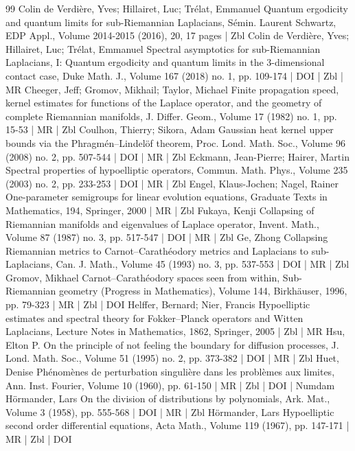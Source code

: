 \begin{thebibliography}{99}
Colin de Verdière, Yves; Hillairet, Luc; Trélat, Emmanuel Quantum ergodicity and quantum limits for sub-Riemannian Laplacians, Sémin. Laurent Schwartz, EDP Appl., Volume 2014-2015 (2016), 20, 17 pages | Zbl
Colin de Verdière, Yves; Hillairet, Luc; Trélat, Emmanuel Spectral asymptotics for sub-Riemannian Laplacians, I: Quantum ergodicity and quantum limits in the 3-dimensional contact case, Duke Math. J., Volume 167 (2018) no. 1, pp. 109-174 | DOI | Zbl | MR
Cheeger, Jeff; Gromov, Mikhail; Taylor, Michael Finite propagation speed, kernel estimates for functions of the Laplace operator, and the geometry of complete Riemannian manifolds, J. Differ. Geom., Volume 17 (1982) no. 1, pp. 15-53 | MR | Zbl
Coulhon, Thierry; Sikora, Adam Gaussian heat kernel upper bounds via the Phragmén–Lindelöf theorem, Proc. Lond. Math. Soc., Volume 96 (2008) no. 2, pp. 507-544 | DOI | MR | Zbl
Eckmann, Jean-Pierre; Hairer, Martin Spectral properties of hypoelliptic operators, Commun. Math. Phys., Volume 235 (2003) no. 2, pp. 233-253 | DOI | MR | Zbl
Engel, Klaus-Jochen; Nagel, Rainer One-parameter semigroups for linear evolution equations, Graduate Texts in Mathematics, 194, Springer, 2000 | MR | Zbl
Fukaya, Kenji Collapsing of Riemannian manifolds and eigenvalues of Laplace operator, Invent. Math., Volume 87 (1987) no. 3, pp. 517-547 | DOI | MR | Zbl
Ge, Zhong Collapsing Riemannian metrics to Carnot–Carathéodory metrics and Laplacians to sub-Laplacians, Can. J. Math., Volume 45 (1993) no. 3, pp. 537-553 | DOI | MR | Zbl
Gromov, Mikhael Carnot–Carathéodory spaces seen from within, Sub-Riemannian geometry (Progress in Mathematics), Volume 144, Birkhäuser, 1996, pp. 79-323 | MR | Zbl | DOI
Helffer, Bernard; Nier, Francis Hypoelliptic estimates and spectral theory for Fokker–Planck operators and Witten Laplacians, Lecture Notes in Mathematics, 1862, Springer, 2005 | Zbl | MR
Hsu, Elton P. On the principle of not feeling the boundary for diffusion processes, J. Lond. Math. Soc., Volume 51 (1995) no. 2, pp. 373-382 | DOI | MR | Zbl
Huet, Denise Phénomènes de perturbation singulière dans les problèmes aux limites, Ann. Inst. Fourier, Volume 10 (1960), pp. 61-150 | MR | Zbl | DOI | Numdam
Hörmander, Lars On the division of distributions by polynomials, Ark. Mat., Volume 3 (1958), pp. 555-568 | DOI | MR | Zbl
Hörmander, Lars Hypoelliptic second order differential equations, Acta Math., Volume 119 (1967), pp. 147-171 | MR | Zbl | DOI

\end{thebibliography}
